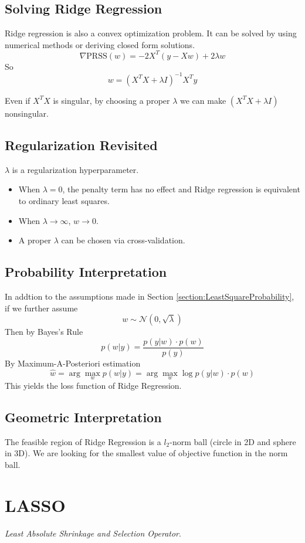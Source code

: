 \subsection{Solving Ridge Regression}
Ridge regression is also a convex optimization problem. It can be solved by using numerical methods or deriving closed form solutions.
\[ \nabla\textrm{PRSS}(w) = -2X^T(y-Xw) + 2\lambda w \]
So
\[ w = (X^TX + \lambda I)^{-1}X^Ty \]
\begin{remark}
    Even if $X^TX$ is singular, by choosing a proper $\lambda$ we can make $(X^TX + \lambda I)$ nonsingular.
\end{remark}
\subsection{Regularization Revisited}
$\lambda$ is a regularization hyperparameter.
\begin{itemize}
    \item When $\lambda = 0$, the penalty term has no effect and Ridge regression is equivalent to ordinary least squares.
    \item When $\lambda \to \infty$, $w\to 0 $.
    \item A proper $\lambda$ can be chosen via cross-validation.
\end{itemize}
\subsection{Probability Interpretation}
In addtion to the assumptions made in Section \ref{section:LeastSquareProbability}, if we further assume
\[ w \sim \mathcal{N}(0,\sqrt{\lambda}) \]
Then by Bayes's Rule
\[ p(w|y) = \frac{p(y|w)\cdot p(w)}{p(y)} \]
By Maximum-A-Posteriori estimation
\[ \hat{w} = \arg \max_w p(w|y) = \arg \max_w \log p(y|w)\cdot p(w) \]
This yields the loss function of Ridge Regression.
\subsection{Geometric Interpretation}
The feasible region of Ridge Regression is a $l_2$-norm ball (circle in 2D and sphere in 3D). We are looking for the smallest value of objective function in the norm ball.

\section{LASSO}
\emph{Least Absolute Shrinkage and Selection Operator}.
